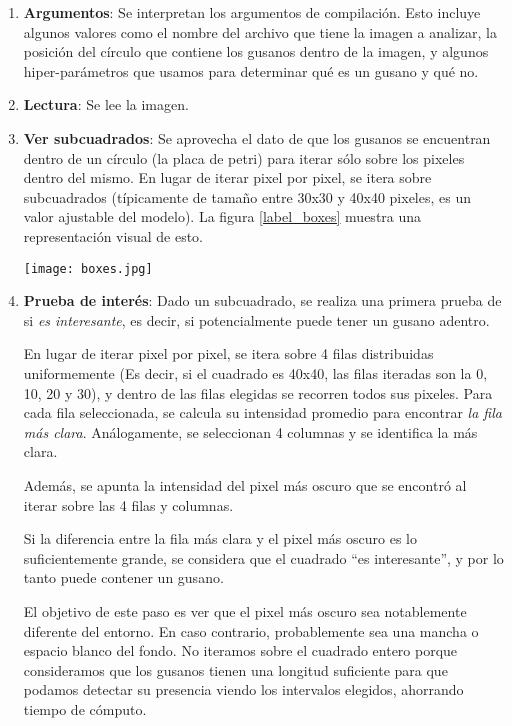 \documentclass{article}
\begin{document}
\begin{enumerate}
\item \textbf{Argumentos}: Se interpretan los argumentos de compilación. Esto incluye algunos valores como el nombre del archivo que tiene la imagen a analizar, la posición del círculo que contiene los gusanos dentro de la imagen, y algunos hiper-parámetros que usamos para determinar qué es un gusano y qué no.

\item \textbf{Lectura}: Se lee la imagen.

\item \textbf{Ver subcuadrados}: Se aprovecha el dato de que los gusanos se encuentran dentro de un círculo (la placa de petri) para iterar sólo sobre los pixeles dentro del mismo. En lugar de iterar pixel por pixel, se itera sobre subcuadrados (típicamente de tamaño entre 30x30 y 40x40 pixeles, es un valor ajustable del modelo). La figura \ref{label_boxes} muestra una representación visual de esto.

\begin{figure*}[h]
    \centering
    \texttt{[image: boxes.jpg]}
    \caption{cuadrados iterados}
    \label{label_boxes}
\end{figure*}

\item \textbf{Prueba de interés}: Dado un subcuadrado, se realiza una primera prueba de si \emph{es interesante}, es decir, si potencialmente puede tener un gusano adentro.

\hspace{0.2cm} En lugar de iterar pixel por pixel, se itera sobre 4 filas distribuidas uniformemente (Es decir, si el cuadrado es 40x40, las filas iteradas son la 0, 10, 20 y 30), y dentro de las filas elegidas se recorren todos sus pixeles. Para cada fila seleccionada, se calcula su intensidad promedio para encontrar \emph{la fila más clara}. Análogamente, se seleccionan 4 columnas y se identifica la más clara.

\hspace{0.2cm} Además, se apunta la intensidad del pixel más oscuro que se encontró al iterar sobre las 4 filas y columnas.

\hspace{0.2cm} Si la diferencia entre la fila más clara y el pixel más oscuro es lo suficientemente grande, se considera que el cuadrado ``es interesante'', y por lo tanto puede contener un gusano.

\hspace{0.2cm} El objetivo de este paso es ver que el pixel más oscuro sea notablemente diferente del entorno. En caso contrario, probablemente sea una mancha o espacio blanco del fondo. No iteramos sobre el cuadrado entero porque consideramos que los gusanos tienen una longitud suficiente para que podamos detectar su presencia viendo los intervalos elegidos, ahorrando tiempo de cómputo.


\end{enumerate}
\end{document}
